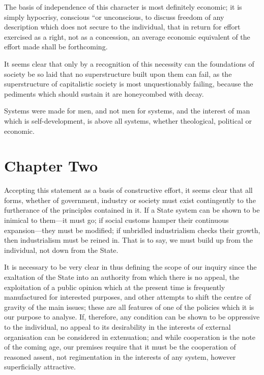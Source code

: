 \documentclass{book}
\begin{document}
The basis of independence of this character is most definitely economic; it is simply hypocrisy, conscious “or unconscious, to discuss freedom of any description which does not secure to the individual, that in return for effort exercised as a right, not as a concession, an average economic equivalent of the effort made shall be forthcoming.

It seems clear that only by a recognition of this necessity can the foundations of society be so laid that no superstructure built upon them can fail, as the superstructure of capitalistic society is most unquestionably failing, because the pediments which should sustain it are honeycombed with decay.

Systems were made for men, and not men for systems, and the interest of man which is self-development, is above all systems, whether theological, political or economic.

\chapter{Chapter Two}
\label{chapter-2}
Accepting this statement as a basis of constructive effort, it seems clear that all forms, whether of government, industry or society must exist contingently to the furtherance of the principles contained in it. If a State system can be shown to be inimical to them—it must go; if social customs hamper their continuous expansion—they must be modified; if unbridled industrialism checks their growth, then industrialism must be reined in. That is to say, we must build up from the individual, not down from the State.

It is necessary to be very clear in thus defining the scope of our inquiry since the exaltation of the State into an authority from which there is no appeal, the exploitation of a public opinion which at the present time is frequently manufactured for interested purposes, and other attempts to shift the centre of gravity of the main issues; these are all features of one of the policies which it is our purpose to analyse. If, therefore, any condition can be shown to be oppressive to the individual, no appeal to its desirability in the interests of external organisation can be considered in extenuation; and while cooperation is the note of the coming age, our premises require that it must be the cooperation of reasoned assent, not regimentation in the interests of any system, however superficially attractive.
\end{document}
